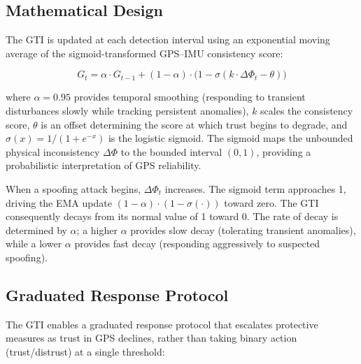 \subsection{Mathematical Design}

The GTI is updated at each detection interval using an exponential moving average of the sigmoid-transformed GPS--IMU consistency score:

\begin{equation}
    G_t = \alpha \cdot G_{t-1} + (1 - \alpha) \cdot \bigl( 1 - \sigma(k \cdot \Delta \Phi_t - \theta) \bigr)
    \label{eq:gti_full}
\end{equation}

where \(\alpha = 0.95\) provides temporal smoothing (responding to transient disturbances slowly while tracking persistent anomalies), \(k\) scales the consistency score, \(\theta\) is an offset determining the score at which trust begins to degrade, and \(\sigma(x) = 1 / (1 + e^{-x})\) is the logistic sigmoid. The sigmoid maps the unbounded physical inconsistency \(\Delta \Phi\) to the bounded interval \((0, 1)\), providing a probabilistic interpretation of GPS reliability.

When a spoofing attack begins, \(\Delta \Phi_t\) increases. The sigmoid term approaches 1, driving the EMA update \((1 - \alpha) \cdot (1 - \sigma(\cdot))\) toward zero. The GTI consequently decays from its normal value of 1 toward 0. The rate of decay is determined by \(\alpha\); a higher \(\alpha\) provides slow decay (tolerating transient anomalies), while a lower \(\alpha\) provides fast decay (responding aggressively to suspected spoofing).

\subsection{Graduated Response Protocol}

The GTI enables a graduated response protocol that escalates protective measures as trust in GPS declines, rather than taking binary action (trust/distrust) at a single threshold:


